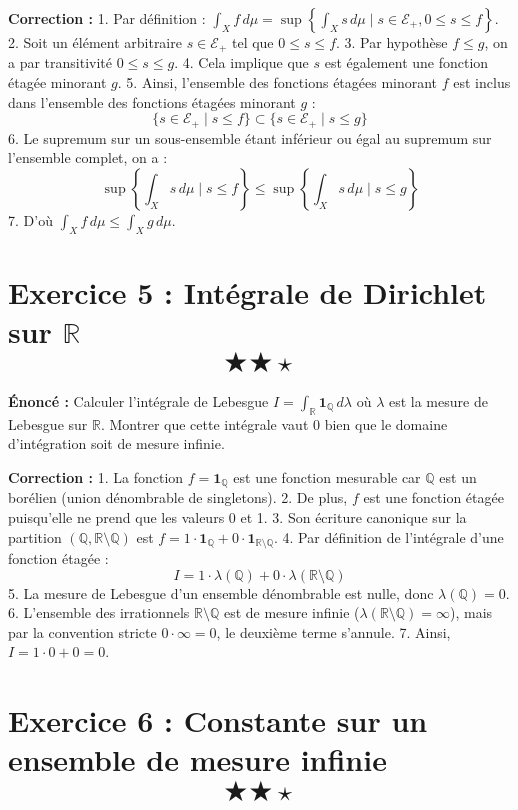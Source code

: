 \documentclass[11pt,a4paper]{article}
\begin{document}
\textbf{Correction :}
1. Par définition : $\int_X f \, d\mu = \sup \left\lbrace \int_X s \, d\mu \mid s \in \mathcal{E}_+, 0 \le s \le f \right\rbrace$.
2. Soit un élément arbitraire $s \in \mathcal{E}_+$ tel que $0 \le s \le f$.
3. Par hypothèse $f \le g$, on a par transitivité $0 \le s \le g$.
4. Cela implique que $s$ est également une fonction étagée minorant $g$.
5. Ainsi, l'ensemble des fonctions étagées minorant $f$ est inclus dans l'ensemble des fonctions étagées minorant $g$ :
   $$\{ s \in \mathcal{E}_+ \mid s \le f \} \subset \{ s \in \mathcal{E}_+ \mid s \le g \}$$
6. Le supremum sur un sous-ensemble étant inférieur ou égal au supremum sur l'ensemble complet, on a :
   $$\sup \left\lbrace \int_X s \, d\mu \mid s \le f \right\rbrace \le \sup \left\lbrace \int_X s \, d\mu \mid s \le g \right\rbrace$$
7. D'où $\int_X f \, d\mu \le \int_X g \, d\mu$.


\section{Exercice 5 : Intégrale de Dirichlet sur $\mathbb{R}$ \quad $$\bigstar\bigstar\star$$}

\textbf{Énoncé :}
Calculer l'intégrale de Lebesgue $I = \int_{\mathbb{R}} \mathbf{1}_{\mathbb{Q}} \, d\lambda$ où $\lambda$ est la mesure de Lebesgue sur $\mathbb{R}$.
Montrer que cette intégrale vaut 0 bien que le domaine d'intégration soit de mesure infinie.

\textbf{Correction :}
1. La fonction $f = \mathbf{1}_{\mathbb{Q}}$ est une fonction mesurable car $\mathbb{Q}$ est un borélien (union dénombrable de singletons).
2. De plus, $f$ est une fonction étagée puisqu'elle ne prend que les valeurs 0 et 1.
3. Son écriture canonique sur la partition $(\mathbb{Q}, \mathbb{R} \setminus \mathbb{Q})$ est $f = 1 \cdot \mathbf{1}_{\mathbb{Q}} + 0 \cdot \mathbf{1}_{\mathbb{R} \setminus \mathbb{Q}}$.
4. Par définition de l'intégrale d'une fonction étagée :
   $$I = 1 \cdot \lambda(\mathbb{Q}) + 0 \cdot \lambda(\mathbb{R} \setminus \mathbb{Q})$$
5. La mesure de Lebesgue d'un ensemble dénombrable est nulle, donc $\lambda(\mathbb{Q}) = 0$.
6. L'ensemble des irrationnels $\mathbb{R} \setminus \mathbb{Q}$ est de mesure infinie ($\lambda(\mathbb{R} \setminus \mathbb{Q}) = \infty$), mais par la convention stricte $0 \cdot \infty = 0$, le deuxième terme s'annule.
7. Ainsi, $I = 1 \cdot 0 + 0 = 0$.


\section{Exercice 6 : Constante sur un ensemble de mesure infinie \quad $$\bigstar\bigstar\star$$}
\end{document}
